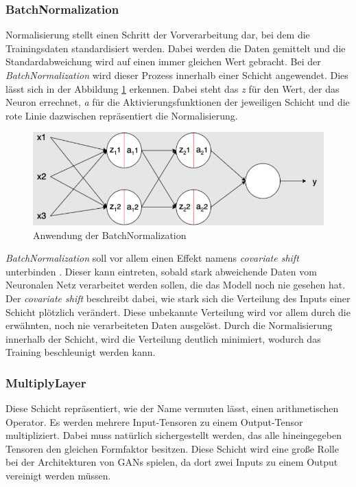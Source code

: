\subsubsection{BatchNormalization}

Normalisierung stellt einen Schritt der Vorverarbeitung dar, bei dem die Trainingsdaten standardisiert werden.
Dabei werden die Daten gemittelt und die Standardabweichung wird auf einen immer gleichen Wert gebracht.
Bei der \textit{BatchNormalization} wird dieser Prozess innerhalb einer Schicht angewendet.
Dies lässt sich in der Abbildung \ref{img:batch-norm} erkennen.
Dabei steht das \textit{z} für den Wert, der das Neuron errechnet, \textit{a} für die Aktivierungsfunktionen der jeweiligen Schicht und die rote Linie dazwischen repräsentiert die Normalisierung.

\begin{figure}[H]
	\centering
	\includegraphics[width=12cm]{kapitel/2_stand_der_technik/img/batchNormalization.png}
	\caption[Anwendung der BatchNormalization]{Anwendung der BatchNormalization \cite{batch-normalization}}
	\label{img:batch-norm}
\end{figure}

\textit{BatchNormalization} soll vor allem einen Effekt namens \textit{covariate shift} unterbinden \cite{batch-normalization-paper}.
Dieser kann eintreten, sobald stark abweichende Daten vom Neuronalen Netz verarbeitet werden sollen, die das Modell noch nie gesehen hat.
Der \textit{covariate shift} beschreibt dabei, wie stark sich die Verteilung des Inputs einer Schicht plötzlich verändert.
Diese unbekannte Verteilung wird vor allem durch die erwähnten, noch nie verarbeiteten Daten ausgelöst.
Durch die Normalisierung innerhalb der Schicht, wird die Verteilung deutlich minimiert, wodurch das Training beschleunigt werden kann. 

\subsubsection{MultiplyLayer}
Diese Schicht repräsentiert, wie der Name vermuten lässt, einen arithmetischen Operator.
Es werden mehrere Input-Tensoren zu einem Output-Tensor multipliziert.
Dabei muss natürlich sichergestellt werden, das alle hineingegeben Tensoren den gleichen Formfaktor besitzen.
Diese Schicht wird eine große Rolle bei der Architekturen von GANs spielen, da dort zwei Inputs zu einem Output vereinigt werden müssen.

